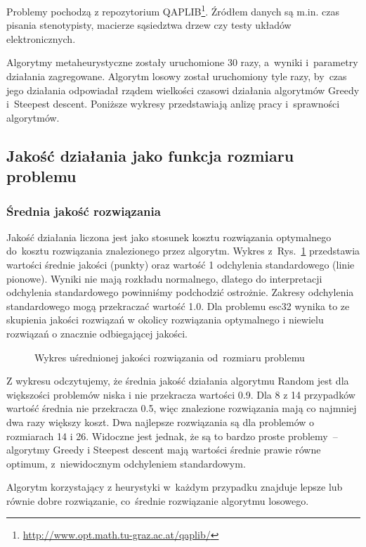 \documentclass[a4paper,10pt]{article}
\begin{document}
Problemy pochodzą z repozytorium QAPLIB\footnote{\url{http://www.opt.math.tu-graz.ac.at/qaplib/}}.
Źródłem danych są m.in. czas pisania stenotypisty, macierze sąsiedztwa drzew czy testy układów elektronicznych.

Algorytmy metaheurystyczne zostały uruchomione 30 razy, a~wyniki i~parametry działania zagregowane. 
Algorytm losowy został uruchomiony tyle razy, by~czas jego działania odpowiadał rządem wielkości czasowi działania algorytmów Greedy i~Steepest descent.
Poniższe wykresy przedstawiają anlizę pracy i~sprawności algorytmów.
\subsection{Jakość działania jako funkcja rozmiaru problemu}
\subsubsection{Średnia jakość rozwiązania}
Jakość działania liczona jest jako stosunek kosztu rozwiązania optymalnego do~kosztu rozwiązania znalezionego przez
algorytm.
Wykres z~Rys.~\ref{fig:qualityvssizemean} przedstawia wartości średnie jakości (punkty) oraz wartość 1 odchylenia standardowego (linie pionowe).
Wyniki nie mają rozkładu normalnego, dlatego do interpretacji odchylenia standardowego powinniśmy podchodzić ostrożnie.
Zakresy odchylenia standardowego mogą przekraczać wartość \num{1.0}.
Dla problemu esc32 wynika to ze skupienia jakości rozwiązań w okolicy rozwiązania optymalnego i niewielu rozwiązań o znacznie odbiegającej jakości.
\begin{figure}[!htpb]
\begin{center}

\caption{Wykres uśrednionej jakości rozwiązania od~rozmiaru problemu}
\label{fig:qualityvssizemean}
\end{center}
\end{figure}

Z wykresu odczytujemy, że średnia jakość działania algorytmu Random jest dla większości problemów niska i nie przekracza wartości \num{0.9}.  
Dla 8 z 14 przypadków wartość średnia nie przekracza \num{0.5}, więc znalezione rozwiązania mają co najmniej dwa razy większy koszt.
Dwa najlepsze rozwiązania są dla problemów o rozmiarach 14 i 26.
Widoczne jest jednak, że są to bardzo proste problemy~-- algorytmy Greedy i Steepest descent mają wartości średnie prawie równe optimum,
z~niewidocznym odchyleniem standardowym.

Algorytm korzystający z heurystyki w~każdym przypadku znajduje lepsze lub równie dobre rozwiązanie, co~średnie rozwiązanie algorytmu losowego.
\end{document}
